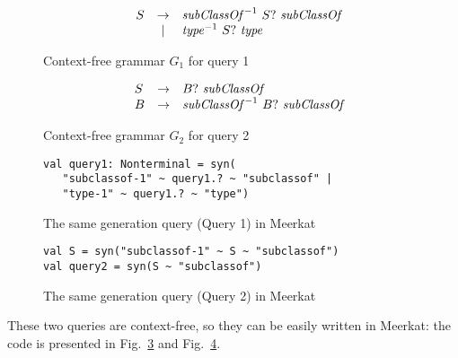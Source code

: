 \begin{figure}[h]
   \centering
   \[
\begin{array}{rlcl}
   & S &  \rightarrow & \text{\textit{subClassOf}}^{-1} \ S? \ \text{\textit{subClassOf}} \\
   &   & |            & \text{\textit{type}}^{-1} \ S? \ \text{\textit{type}} \\
\end{array}
\]
   \caption{Context-free grammar $G_1$ for query 1}
   \label{grammarQ1}
   \end{figure}

\begin{figure}[h]
   \centering
   \[
\begin{array}{rlcl}
   & S & \rightarrow & B? \ \text{\textit{subClassOf}} \\
   & B & \rightarrow & \text{\textit{subClassOf}}^{-1} \ B? \ \text{\textit{subClassOf}} \\
\end{array}
\]
   \caption{Context-free grammar $G_2$ for query 2}
   \label{grammarQ2}
   \end{figure}


\begin{figure}[h]
\begin{lstlisting}
val query1: Nonterminal = syn(
   "subclassof-1" ~ query1.? ~ "subclassof" |
   "type-1" ~ query1.? ~ "type")
\end{lstlisting}
\caption{The same generation query (Query 1) in Meerkat}
\label{fig:query1Meerkat}
\end{figure}


\begin{figure}[h]
\begin{lstlisting}
val S = syn("subclassof-1" ~ S ~ "subclassof")
val query2 = syn(S ~ "subclassof")
\end{lstlisting}
\caption{The same generation query (Query 2) in Meerkat}
\label{fig:query2Meerkat}
\end{figure}

These two queries are context-free, so they can be easily written in Meerkat: the code is presented in Fig.~\ref{fig:query1Meerkat} and Fig.~\ref{fig:query2Meerkat}.

